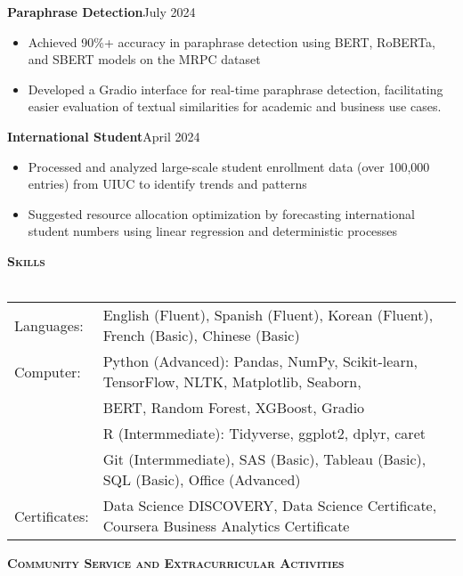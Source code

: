 \documentclass[a4paper]{article}
\newcommand{\lineunder} {
    \vspace*{-8pt} \\
    \hspace*{-18pt} \hrulefill \\
}
\newcommand{\header} [1] {
    {\hspace*{-18pt}\vspace*{6pt} \textsc{#1}}
    \vspace*{-6pt} \lineunder
}
\begin{document}
\textbf{Paraphrase Detection}\hfill{July 2024}\\
\begin{itemize}[nolistsep]
    \item Achieved 90\%+ accuracy in paraphrase detection using BERT, RoBERTa,
     and SBERT models on the MRPC dataset
    \item Developed a Gradio interface for real-time paraphrase detection, facilitating easier evaluation 
    of textual similarities for academic and business use cases.
\end{itemize}

\textbf{International Student}\hfill{April 2024}\\
\begin{itemize}[nolistsep]
    \item Processed and analyzed large-scale student enrollment data 
    (over 100,000 entries) from UIUC to identify trends and patterns
    \item Suggested resource allocation optimization by forecasting 
    international student numbers using linear regression and deterministic processes
    \end{itemize}



\vspace*{1mm}

\header{\textbf{Skills}}
\begin{tabular}{ l l }
    Languages: & English (Fluent), Spanish (Fluent), Korean (Fluent), French (Basic), Chinese (Basic)              \\
    Computer: & Python (Advanced): Pandas, NumPy, Scikit-learn, TensorFlow, 
    NLTK, Matplotlib, Seaborn, \\
    & BERT, Random Forest, XGBoost, Gradio\\
    & R (Intermmediate): Tidyverse, ggplot2, dplyr, caret\\
    & Git (Intermmediate), SAS (Basic), Tableau (Basic), SQL (Basic), Office (Advanced)\\
    Certificates: & Data Science DISCOVERY, Data Science Certificate, 
    Coursera Business Analytics Certificate
\end{tabular}


\vspace{1mm}


\header{\textbf{Community Service and Extracurricular Activities}}
\end{document}
